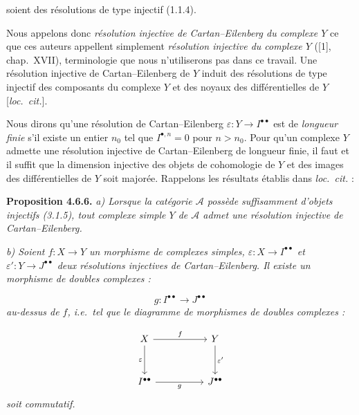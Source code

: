 \clearpage
{}%
\begingroup\small\setlength{\parskip}{0pt}\setlength{\emergencystretch}{1.5em}
\setlength{\abovedisplayskip}{4pt plus 2pt minus 2pt}%
\setlength{\belowdisplayskip}{4pt plus 2pt minus 2pt}%

\noindent soient des résolutions de type injectif (1.1.4).

Nous appelons donc \emph{résolution injective de Cartan--Eilenberg du
complexe $Y$} ce que ces auteurs appellent simplement \emph{résolution
injective du complexe $Y$} ([1], chap.~XVII), terminologie que nous
n'utiliserons pas dans ce travail. Une résolution injective de
Cartan--Eilenberg de $Y$ induit des résolutions de type injectif des
composants du complexe $Y$ et des noyaux des différentielles de $Y$
[\emph{loc.\ cit.}].

Nous dirons qu'une résolution de Cartan--Eilenberg
$\varepsilon\colon Y\longrightarrow I^{\bullet\bullet}$ est de
\emph{longueur finie} s'il existe un entier $n_0$ tel que
$I^{\bullet,n}=0$ pour $n>n_0$. Pour qu'un complexe $Y$ admette une
résolution injective de Cartan--Eilenberg de longueur finie, il faut et il
suffit que la dimension injective des objets de cohomologie de $Y$ et des
images des différentielles de $Y$ soit majorée. Rappelons les résultats
établis dans \emph{loc.\ cit.} :

\medskip\noindent\textbf{Proposition 4.6.6.}\quad
\textit{a) Lorsque la catégorie $\mathcal A$ possède suffisamment
d'objets injectifs (3.1.5), tout complexe simple $Y$ de $\mathcal A$ admet
une résolution injective de Cartan--Eilenberg.}

\noindent\textit{b) Soient
$f\colon X\longrightarrow Y$ un morphisme de complexes simples,
$\varepsilon\colon X\longrightarrow I^{\bullet\bullet}$ et
$\varepsilon'\colon Y\longrightarrow J^{\bullet\bullet}$ deux résolutions
injectives de Cartan--Eilenberg. Il existe un morphisme de doubles
complexes :}

\[
\textit{$g\colon I^{\bullet\bullet}\longrightarrow J^{\bullet\bullet}$}
\]
\textit{au-dessus de $f$, i.e.\ tel que le diagramme de morphismes de
doubles complexes :}

\[
\begin{tikzcd}[column sep=5.0em,row sep=3.0em]
X \arrow[r,"f"] \arrow[d,"\varepsilon"'] &
Y \arrow[d,"\varepsilon'"] \\
I^{\bullet\bullet} \arrow[r,"g"'] &
J^{\bullet\bullet}
\end{tikzcd}
\]
\textit{soit commutatif.}

